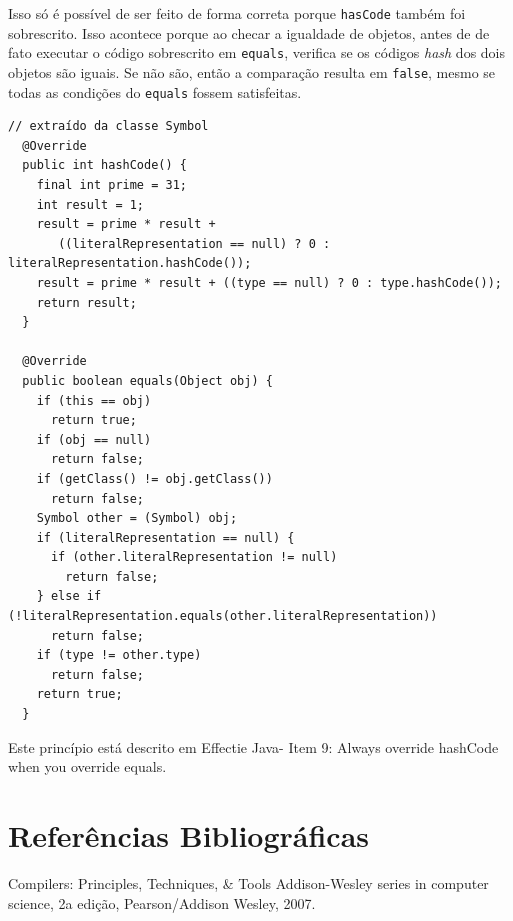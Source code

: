 \documentclass[11pt]{article}
\begin{document}
Isso só é possível de ser feito de forma correta porque \texttt{hasCode} também foi
sobrescrito. Isso acontece porque ao checar a igualdade de objetos, antes de
de fato executar o código sobrescrito em \texttt{equals}, verifica se os códigos \emph{hash}
dos dois objetos são iguais. Se não são, então a comparação resulta em \texttt{false},
mesmo se todas as condições do \texttt{equals} fossem satisfeitas.

\begin{verbatim}
// extraído da classe Symbol
  @Override
  public int hashCode() {
    final int prime = 31;
    int result = 1;
    result = prime * result + 
       ((literalRepresentation == null) ? 0 : literalRepresentation.hashCode());
    result = prime * result + ((type == null) ? 0 : type.hashCode());
    return result;
  }

  @Override
  public boolean equals(Object obj) {
    if (this == obj)
      return true;
    if (obj == null)
      return false;
    if (getClass() != obj.getClass())
      return false;
    Symbol other = (Symbol) obj;
    if (literalRepresentation == null) {
      if (other.literalRepresentation != null)
        return false;
    } else if (!literalRepresentation.equals(other.literalRepresentation))
      return false;
    if (type != other.type)
      return false;
    return true;
  }
\end{verbatim}

Este princípio está descrito em Effectie Java- Item 9: Always override hashCode when you override equals.

\section{Referências Bibliográficas}
\label{sec:orgheadline22}
Compilers: Principles, Techniques, \& Tools Addison-Wesley series in computer science, 2a edição, Pearson/Addison Wesley, 2007.
\end{document}
